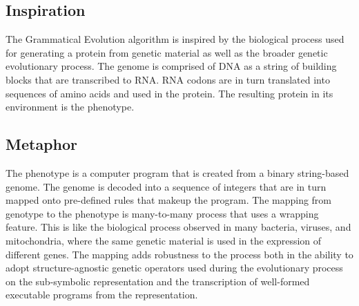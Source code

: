 \subsection{Inspiration}
The Grammatical Evolution algorithm is inspired by the biological process used for generating a protein from genetic material as well as the broader genetic evolutionary process.
The genome is comprised of DNA as a string of building blocks that are transcribed to RNA. RNA codons are in turn translated into sequences of amino acids and used in the protein. The resulting protein in its environment is the phenotype. 

\subsection{Metaphor}
The phenotype is a computer program that is created from a binary string-based genome. The genome is decoded into a sequence of integers that are in turn mapped onto pre-defined rules that makeup the program. 
The mapping from genotype to the phenotype is many-to-many process that uses a wrapping feature. This is like the biological process observed in many bacteria, viruses, and mitochondria, where the same genetic material is used in the expression of different genes.
The mapping adds robustness to the process both in the ability to adopt structure-agnostic genetic operators used during the evolutionary process on the sub-symbolic representation and the transcription of well-formed executable programs from the representation.

